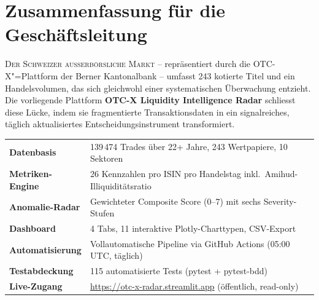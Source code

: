 \documentclass[11pt, a4paper, oneside, openany]{report}
\begin{document}

\chapter*{Zusammenfassung für die Geschäftsleitung}

\lettrine[lines=3, lraise=0.1, findent=3pt, nindent=0pt]{\textcolor{SwissRed}{D}}{er Schweizer ausserbörsliche Markt} -- repräsentiert durch die OTC-X"=Plattform der Berner Kantonalbank -- umfasst 243 kotierte Titel und ein Handelsvolumen, das sich gleichwohl einer systematischen Überwachung entzieht. Die vorliegende Plattform \textbf{OTC-X Liquidity Intelligence Radar} schliesst diese Lücke, indem sie fragmentierte Transaktionsdaten in ein signalreiches, täglich aktualisiertes Entscheidungsinstrument transformiert.

\begin{table}[H]
\centering
\sffamily\small
\begin{tabularx}{\textwidth}{>{\bfseries\sffamily\color{SwissRed}}l X}
  \toprule
  Datenbasis        & 139\,474 Trades über 22+ Jahre, 243 Wertpapiere, 10 Sektoren \\
  Metriken-Engine   & 26 Kennzahlen pro ISIN pro Handelstag inkl.\ Amihud-Illiquiditätsratio \\
  Anomalie-Radar    & Gewichteter Composite Score (0--7) mit sechs Severity-Stufen \\
  Dashboard         & 4 Tabs, 11 interaktive Plotly-Charttypen, CSV-Export \\
  Automatisierung   & Vollautomatische Pipeline via GitHub Actions (05:00\,UTC, täglich) \\
  Testabdeckung     & 115 automatisierte Tests (pytest + pytest-bdd) \\
  Live-Zugang       & \url{https://otc-x-radar.streamlit.app} (öffentlich, read-only) \\
  \bottomrule
\end{tabularx}
\end{table}
\end{document}
